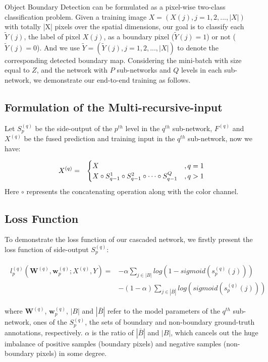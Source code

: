 \documentclass[senior]{IPSstyle}
\begin{document}
Object Boundary Detection can be formulated as a pixel-wise two-class classification problem. Given a training image \(X = (X(j), j = 1, 2, ..., |X|)\) with totally |X| pixels over the spatial dimensions, our goal is to classify each \(\tilde{Y}(j)\), the label of pixel \(X(j)\), as a boundary pixel (\(\tilde{Y}(j) = 1\)) or not (\(\tilde{Y}(j) = 0\)). And we use \(\tilde{Y} = (\tilde{Y}(j), j = 1, 2, ..., |X|)\) to denote the corresponding detected boundary map. Considering the mini-batch with size equal to \(Z\), and the network with \(P\) sub-networks and \(Q\) levels in each sub-network, we demonstrate our end-to-end training as follows.

\subsection{Formulation of the Multi-recursive-input}
Let \(S_{p}^{(q)}\) be the side-output of the \(p^{th}\) level in the \(q^{th}\) sub-network, \(F^{(q)}\) and \(X^{(q)}\) be the fused prediction and training input in the \(q^{th}\) sub-network, now we have:

\begin{eqnarray}
X^{(q)} &=& 
\begin{cases} 
X &, q = 1 \cr
X \circ S_{q-1}^{1} \circ S_{q-1}^{2} \circ \cdots \circ S_{q-1}^{Q} &, q > 1 \cr
\end{cases}
\end{eqnarray}
Here \(\circ\) represents the concatenating operation along with the color channel. 

\subsection{Loss Function}
To demonstrate the loss function of our cascaded network, we firstly present the loss function of side-output \(S_{p}^{(q)}\):

\begin{eqnarray}
\begin{split}
l_{p}^{(q)}(\textbf{W}^{(q)}, \textbf{w}_{p}^{(q)}; X^{(q)}, Y)
=&-\alpha \sum_{j\in{|B|}}log(1 - sigmoid(s_{p}^{(q)}(j))) \\
&-(1-\alpha) \sum_{j\in{|\bar{B}|}}log(sigmoid(s_{p}^{(q)}(j)))
\end{split}
\end{eqnarray}

where \(\textbf{W}^{(q)}\), \(\textbf{w}_{p}^{(q)}\), \(|B|\) and \(|\bar{B}|\) refer to the model parameters of the \(q^{th}\) sub-network, ones of the \(S_{p}^{(q)}\), the sets of boundary and non-boundary ground-truth annotations, respectively. \(\alpha\) is the ratio of \(|\bar{B}|\) and \(|B|\), which cancels out the huge imbalance of positive samples (boundary pixels) and negative samples (non-boundary pixels) in some degree\cite{Xie2015}. 
\end{document}
